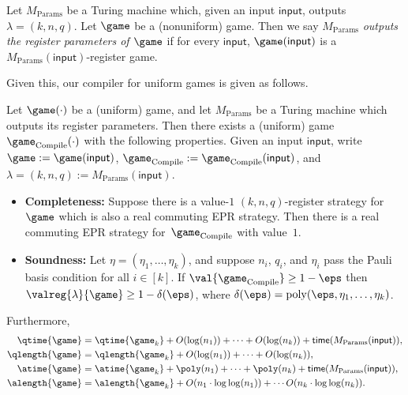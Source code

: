 \begin{definition}\label{def:reg-params-generator}
Let $M_{\mathrm{Params}}$ be a Turing machine which,
given an input $\mathsf{input}$, outputs $\lambda = (k, n, q)$.
Let $\game$ be a (nonuniform) game.
Then we say $M_{\mathrm{Params}}$ \emph{outputs the register parameters of $\game$}
if for every $\mathsf{input}$, $\game(\mathsf{input})$ is a $M_{\mathrm{Params}}(\mathsf{input})$-register game.
\end{definition}

Given this, our compiler for uniform games is given as follows.

\begin{corollary}\label{thm:uniform-registers}
Let $\game(\cdot)$ be a (uniform) game,
and let $M_{\mathrm{Params}}$ be a Turing machine which outputs its register parameters.
Then there exists a (uniform) game $\game_{\mathrm{Compile}}(\cdot)$ with the following properties.
Given an input $\mathsf{input}$, write $\game:=\game(\mathsf{input})$,
$\game_{\mathrm{Compile}} := \game_{\mathrm{Compile}}(\mathsf{input})$,
and $\lambda = (k, n, q) := M_{\mathrm{Params}}(\mathsf{input})$.
\begin{itemize}
\item[$\circ$] \textbf{Completeness:} Suppose there is a value-$1$ $(k,n,q)$-register strategy for $\game$ which is also a real commuting EPR strategy.
	Then there is a real commuting EPR strategy for~$\game_{\mathrm{Compile}}$ with value~$1$.
\item[$\circ$] \textbf{Soundness:}
Let $\eta = (\eta_1, \ldots, \eta_k)$, and suppose $n_i$, $q_i$, and $\eta_i$ pass the Pauli basis condition for all $i \in [k]$.
If $\val{\game_{\mathrm{Compile}}}\geq 1-\eps$ then $\valreg{\lambda}{\game} \geq 1 -\delta(\eps)$, where $\delta(\eps) = \mathrm{poly}(\eps, \eta_1, \ldots, \eta_k)$.
\end{itemize}
Furthermore,
\begin{align*}
\qtime{\game} &= \qtime{\game_k} + O(\log(n_1))+ \cdots + O(\log(n_k)) + \mathsf{time}(M_{\mathrm{Params}}(\mathsf{input})), \\
\qlength{\game} &= \qlength{\game_k} + O(\log(n_1)) + \cdots + O(\log(n_k)),  \\
\atime{\game} &= \atime{\game_k} + \poly(n_1) + \cdots + \poly(n_k)+ \mathsf{time}(M_{\mathrm{Params}}(\mathsf{input})),\\
\alength{\game} &= \alength{\game_k} + O(n_1 \cdot \log \log(n_1)) + \cdots O(n_k \cdot \log \log(n_k)).
\end{align*}
\end{corollary}

